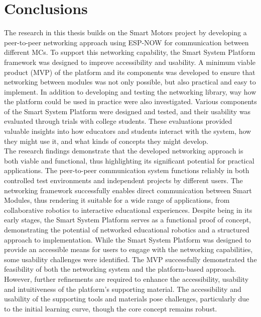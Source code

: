 \cleardoublepage%
\chapter{\label{chap:con}Conclusions}%

The research in this thesis builds on the Smart Motors project \citep{dahal_designing_2024} by developing a peer-to-peer networking approach using ESP-NOW for communication between different MCs. To support this networking capability, the Smart System Platform framework was designed to improve accessibility and usability. A minimum viable product (MVP) of the platform and its components was developed to ensure that networking between modules was not only possible, but also practical and easy to implement. 
In addition to developing and testing the networking library, way how the platform could be used in practice were also investigated. Various components of the Smart System Platform were designed and tested, and their usability was evaluated through trials with college students. These evaluations provided valuable insights into how educators and students interact with the system, how they might use it, and what kinds of concepts they might develop.\\

The research findings demonstrate that the developed networking approach is both viable and functional, thus highlighting its significant potential for practical applications. The peer-to-peer communication system functions reliably in both controlled test environments and independent projects by different users. The networking framework successfully enables direct communication between Smart Modules, thus rendering it suitable for a wide range of applications, from collaborative robotics to interactive educational experiences.
Despite being in its early stages, the Smart System Platform serves as a functional proof of concept, demonstrating the potential of networked educational robotics and a structured approach to implementation. While the Smart System Platform was designed to provide an accessible means for users to engage with the networking capabilities, some usability challenges were identified. The MVP successfully demonstrated the feasibility of both the networking system and the platform-based approach. However, further refinements are required to enhance the accessibility, usability and intuitiveness of the platform's supporting material. The accessibility and usability of the supporting tools and materials pose challenges, particularly due to the initial learning curve, though the core concept remains robust. \\

